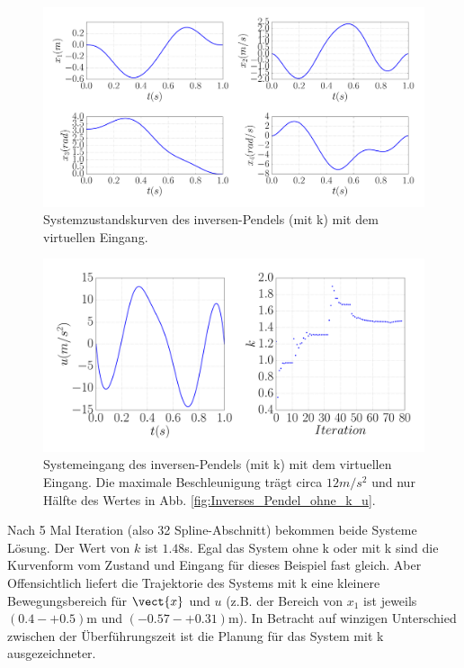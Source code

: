 \begin{beispiel}
	\begin{figure}
		\centering
		\includegraphics[width=15.5cm]{bild/30_32/example0_mit_k_x_ori.pdf}
		\caption{Systemzustandskurven des inversen-Pendels (mit k) mit dem virtuellen Eingang.}
		\label{fig:Inverses_Pendel_mit_k_x_ori}
	\end{figure}
	
	\begin{figure}
		\centering
		\includegraphics[width=12cm]{bild/30_32/example0_mit_k_u_ori.pdf}
		\caption{Systemeingang des inversen-Pendels (mit k) mit dem virtuellen Eingang. Die maximale Beschleunigung trägt circa $12m/s^{2}$ und nur Hälfte des Wertes in Abb. \ref{fig:Inverses_Pendel_ohne_k_u}.}
		\label{fig:Inverses_Pendel_mit_k_u_ori}
	\end{figure}
	
	Nach 5 Mal Iteration (also 32 Spline-Abschnitt) bekommen beide Systeme Lösung. Der Wert von $k$ ist $1.48$s. Egal das System ohne k oder mit k sind die Kurvenform vom Zustand und Eingang für dieses Beispiel fast gleich. Aber Offensichtlich liefert die Trajektorie des Systems mit k eine kleinere Bewegungsbereich für $\vect{x}$ und $u$ (z.B. der Bereich von $x_{1}$ ist jeweils $(0.4-+0.5)$m und $(-0.57-+0.31)$m). In Betracht auf winzigen Unterschied zwischen der Überführungszeit ist die Planung für das System mit k ausgezeichneter.
	

\end{beispiel}
